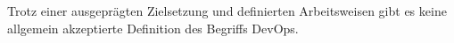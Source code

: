 Trotz einer ausgeprägten Zielsetzung und definierten Arbeitsweisen gibt es keine allgemein akzeptierte Definition des Begriffs DevOps.

